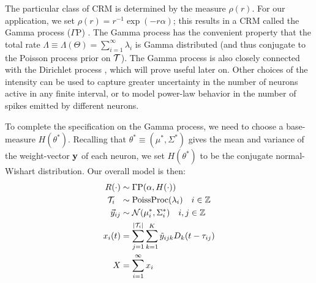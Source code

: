 The particular class of CRM is determined by the \Levy measure $\rho(r)$. For our application, we set $\rho(r) = r^{-1}\exp(-r\alpha)$;
this results in a CRM called the Gamma process ($\Gamma$P) \citep{applebaum2004}. 
The Gamma process has the convenient property that the 
total rate $\Lambda \equiv \Lambda(\Theta) = \sum_{i=1}^{\infty} \lambda_i$ is Gamma distributed (and thus conjugate to the Poisson process prior on $\mathcal{T}$).
The Gamma process is also closely connected with the Dirichlet process \citep{Ferguson73}, which will prove useful
later on.
Other choices of the \Levy intensity can be used to capture greater uncertainty in the number of neurons active in any finite interval, or to model
power-law behavior in the number of spikes emitted by different neurons.

To complete the specification on the Gamma process, we need to choose a base-measure $H(\theta^*)$.
Recalling that $\theta^* \equiv (\mu^*, \Sigma^*)$ gives the mean and variance of the weight-vector $\mathbf{y}$ of each neuron, we set $H(\theta^*)$ 
to be the conjugate normal-Wishart distribution. Our overall model is then:
\begin{align}
  R(\cdot) & \sim \Gamma \text{P}(\alpha, H(\cdot)) \\ %
  \mc{T}_i\ \  &\sim \text{PoissProc}(\lambda_i) \quad i \in \ZZ \\
  \mv{y}_{ij} & \sim \mc{N}(\mu^*_i, \Sigma^*_i) \quad i,j \in \ZZ \\
  x_i(t) &= \sum_{j = 1}^{|\mc{T}_i|}  \sum_{k = 1}^{K} \tilde{y}_{ijk} D_k(t - \tau_{ij}) \\
  X   &= \sum_{i=1}^{\infty} x_i
\end{align}


